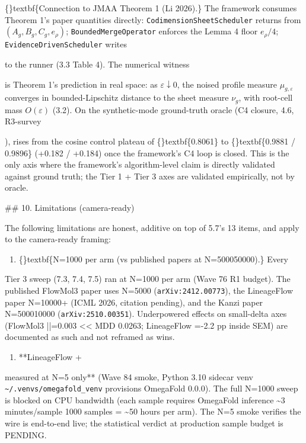 \documentclass{article}
\begin{document}
\{\}textbf\{Connection to JMAA Theorem 1 (Li 2026).\} The framework consumes Theorem 1's paper quantities directly: \texttt{CodimensionSheetScheduler} returns  from $(A_g, B_g, C_g, e_\rho)$; \texttt{BoundedMergeOperator} enforces the Lemma 4 floor $e_\rho/4$; \texttt{EvidenceDrivenScheduler} writes

 to the runner (3.3 Table 4). The numerical witness

 is Theorem 1's prediction in real space: as $\varepsilon \downarrow 0$, the noised profile measure $\mu_{g,\varepsilon}$ converges in bounded-Lipschitz distance to the sheet measure $\nu_g$, with root-cell mass $O(\varepsilon)$ (3.2). On the synthetic-mode ground-truth oracle (C4 closure, 4.6, R3-survey

),  rises from the cosine control plateau of \{\}textbf\{0.8061\} to \{\}textbf\{0.9881 / 0.9896\} (+0.182 / +0.184) once the framework's C4 loop is closed. This is the only axis where the framework's algorithm-level claim is directly validated against ground truth; the Tier 1 + Tier 3 axes are validated empirically, not by oracle.

\#\# 10. Limitations (camera-ready)

The following limitations are honest, additive on top of 5.7's 13 items, and apply to the camera-ready framing:

\begin{enumerate}
\item \{\}textbf\{N=1000 per arm (vs published papers at N=500050000).\} Every
\end{enumerate}
Tier 3 sweep (7.3, 7.4, 7.5) ran at N=1000 per arm (Wave 76 R1 budget). The published FlowMol3 paper uses N=5000 (\texttt{arXiv:2412.00773}), the LineageFlow paper N=10000+ (ICML 2026, citation pending), and the Kanzi paper N=500010000 (\texttt{arXiv:2510.00351}). Underpowered effects on small-delta axes (FlowMol3  ||=0.003 << MDD 0.0263; LineageFlow  =-2.2 pp inside SEM) are documented as such and not reframed as wins.

\begin{enumerate}
\item **LineageFlow  + 
\end{enumerate}
measured at N=5 only** (Wave 84 smoke, Python 3.10 sidecar venv \texttt{\textasciitilde{}/.venvs/omegafold\_venv} provisions OmegaFold 0.0.0). The full N=1000 sweep is blocked on CPU bandwidth (each sample requires OmegaFold inference \textasciitilde{}3 minutes/sample  1000 samples = \textasciitilde{}50 hours per arm). The N=5 smoke verifies the wire is end-to-end live; the statistical verdict at production sample budget is PENDING.
\end{document}
